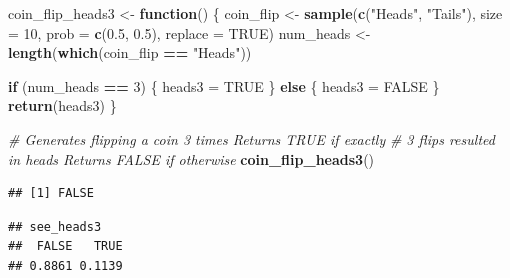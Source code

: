 \documentclass[
]{book}
\newenvironment{Shaded}{\begin{snugshade}}{\end{snugshade}}
\newcommand{\CommentTok}[1]{\textcolor[rgb]{0.56,0.35,0.01}{\textit{#1}}}
\newcommand{\ControlFlowTok}[1]{\textcolor[rgb]{0.13,0.29,0.53}{\textbf{#1}}}
\newcommand{\DataTypeTok}[1]{\textcolor[rgb]{0.13,0.29,0.53}{#1}}
\newcommand{\DecValTok}[1]{\textcolor[rgb]{0.00,0.00,0.81}{#1}}
\newcommand{\FloatTok}[1]{\textcolor[rgb]{0.00,0.00,0.81}{#1}}
\newcommand{\KeywordTok}[1]{\textcolor[rgb]{0.13,0.29,0.53}{\textbf{#1}}}
\newcommand{\NormalTok}[1]{#1}
\newcommand{\OperatorTok}[1]{\textcolor[rgb]{0.81,0.36,0.00}{\textbf{#1}}}
\newcommand{\OtherTok}[1]{\textcolor[rgb]{0.56,0.35,0.01}{#1}}
\newcommand{\StringTok}[1]{\textcolor[rgb]{0.31,0.60,0.02}{#1}}
\begin{document}
\begin{Shaded}
\begin{Highlighting}[]
\NormalTok{coin_flip_heads3 <-}\StringTok{ }\ControlFlowTok{function}\NormalTok{() \{}
\NormalTok{    coin_flip <-}\StringTok{ }\KeywordTok{sample}\NormalTok{(}\KeywordTok{c}\NormalTok{(}\StringTok{"Heads"}\NormalTok{, }\StringTok{"Tails"}\NormalTok{), }\DataTypeTok{size =} \DecValTok{10}\NormalTok{, }\DataTypeTok{prob =} \KeywordTok{c}\NormalTok{(}\FloatTok{0.5}\NormalTok{,}
        \FloatTok{0.5}\NormalTok{), }\DataTypeTok{replace =} \OtherTok{TRUE}\NormalTok{)}
\NormalTok{    num_heads <-}\StringTok{ }\KeywordTok{length}\NormalTok{(}\KeywordTok{which}\NormalTok{(coin_flip }\OperatorTok{==}\StringTok{ "Heads"}\NormalTok{))}

    \ControlFlowTok{if}\NormalTok{ (num_heads }\OperatorTok{==}\StringTok{ }\DecValTok{3}\NormalTok{) \{}
\NormalTok{        heads3 =}\StringTok{ }\OtherTok{TRUE}
\NormalTok{    \} }\ControlFlowTok{else}\NormalTok{ \{}
\NormalTok{        heads3 =}\StringTok{ }\OtherTok{FALSE}
\NormalTok{    \}}
    \KeywordTok{return}\NormalTok{(heads3)}
\NormalTok{\}}



\CommentTok{# Generates flipping a coin 3 times Returns TRUE if exactly}
\CommentTok{# 3 flips resulted in heads Returns FALSE if otherwise}
\KeywordTok{coin_flip_heads3}\NormalTok{()}
\end{Highlighting}
\end{Shaded}

\begin{verbatim}
## [1] FALSE
\end{verbatim}

\begin{Shaded}
\end{Shaded}

\begin{verbatim}
## see_heads3
##  FALSE   TRUE 
## 0.8861 0.1139
\end{verbatim}
\end{document}
